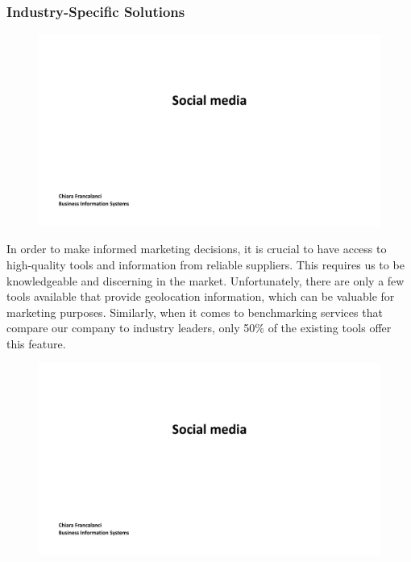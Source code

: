 \subsubsection{Industry-Specific
  Solutions}\label{industry-specific-solutions}

\begin{figure}[!h]
  \centering
  \includegraphics[page=33, trim = 1cm 8cm 1cm 3.5cm, clip, width=\imagewidth]{images/04 - Social_Media.pdf}
\end{figure}

In order to make informed marketing decisions, it is crucial to have
access to high-quality tools and information from reliable suppliers.
This requires us to be knowledgeable and discerning in the market.
Unfortunately, there are only a few tools available that provide
geolocation information, which can be valuable for marketing purposes.
Similarly, when it comes to benchmarking services that compare our
company to industry leaders, only 50\% of the existing tools offer this
feature.

\begin{figure}[!h]
  \centering
  \includegraphics[page=34, trim = 1cm 4.5cm 1cm 0.5cm, clip, width=\imagewidth]{images/04 - Social_Media.pdf}
\end{figure}

